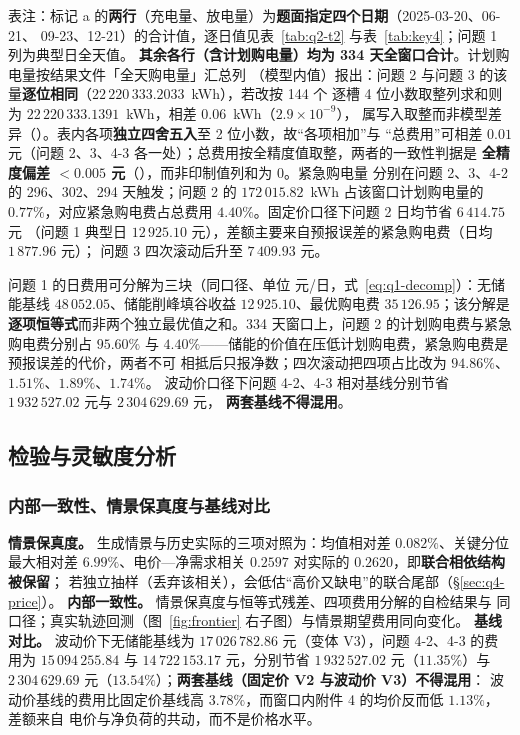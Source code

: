表注：标记 a 的\textbf{两行}（充电量、放电量）为\textbf{题面指定四个日期}（2025-03-20、06-21、
09-23、12-21）的合计值，逐日值见表~\ref{tab:q2-t2} 与表~\ref{tab:key4}；问题 1 列为典型日全天值。
\textbf{其余各行（含计划购电量）均为 334 天全窗口合计}。计划购电量按结果文件「全天购电量」汇总列
（模型内值）报出：问题 2 与问题 3 的该量\textbf{逐位相同}（\(22\,220\,333.2033\)~kWh），若改按 144 个
逐槽 4 位小数取整列求和则为 \(22\,220\,333.1391\)~kWh，相差 \(0.06\)~kWh（\(2.9\times10^{-9}\)），
属写入取整而非模型差异（）。表内各项\textbf{独立四舍五入}至 2 位小数，故“各项相加”与
“总费用”可相差 \(0.01\) 元（问题 2、3、4-3 各一处）；总费用按全精度值取整，两者的一致性判据是
\textbf{全精度偏差 \(<0.005\) 元}（），而非印制值列和为 0。紧急购电量 
分别在问题 2、3、4-2 的 296、302、294 天触发；问题 2 的 \(172\,015.82\)~kWh 占该窗口计划购电量的
\(0.77\%\)，对应紧急购电费占总费用 \(4.40\%\)。固定价口径下问题 2 日均节省 \(6\,414.75\) 元
（问题 1 典型日 \(12\,925.10\) 元），差额主要来自预报误差的紧急购电费（日均 \(1\,877.96\) 元）；
问题 3 四次滚动后升至 \(7\,409.93\) 元。

问题 1 的日费用可分解为三块（同口径、单位 元/日，式~\eqref{eq:q1-decomp}）：无储能基线
\(48\,052.05\)、储能削峰填谷收益 \(12\,925.10\)、最优购电费 \(35\,126.95\)；该分解是
\textbf{逐项恒等式}而非两个独立最优值之和。334 天窗口上，问题 2 的计划购电费与紧急购电费分别占
\(95.60\%\) 与 \(4.40\%\)——储能的价值在压低计划购电费，紧急购电费是预报误差的代价，两者不可
相抵后只报净数；四次滚动把四项占比改为 \(94.86\%\)、\(1.51\%\)、\(1.89\%\)、\(1.74\%\)。
波动价口径下问题 4-2、4-3 相对基线分别节省 \(1\,932\,527.02\) 元与 \(2\,304\,629.69\) 元，
\textbf{两套基线不得混用}。

\subsection{检验与灵敏度分析}

\subsubsection{内部一致性、情景保真度与基线对比}
\textbf{情景保真度。} 生成情景与历史实际的三项对照为：均值相对差 \(0.082\%\)、关键分位最大相对差
\(6.99\%\)、电价—净需求相关 \(0.2597\) 对实际的 \(0.2620\)，即\textbf{联合相依结构被保留}；
若独立抽样（丢弃该相关），会低估“高价又缺电”的联合尾部（\S\ref{sec:q4-price}）。
\textbf{内部一致性。} 情景保真度与恒等式残差、四项费用分解的自检结果与 
同口径；真实轨迹回测（图~\ref{fig:frontier} 右子图）与情景期望费用同向变化。
\textbf{基线对比。} 波动价下无储能基线为 \(17\,026\,782.86\) 元（变体 V3），问题 4-2、4-3 的费用为
\(15\,094\,255.84\) 与 \(14\,722\,153.17\) 元，分别节省 \(1\,932\,527.02\) 元（\(11.35\%\)）与
\(2\,304\,629.69\) 元（\(13.54\%\)）；\textbf{两套基线（固定价 V2 与波动价 V3）不得混用}：
波动价基线的费用比固定价基线高 \(3.78\%\)，而窗口内附件 4 的均价反而低 \(1.13\%\)，差额来自
电价与净负荷的共动，而不是价格水平。

